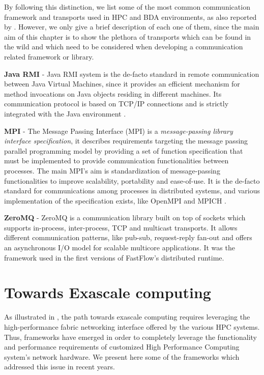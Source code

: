 By following this distinction, we list some of the most common communication framework and transports used in HPC and BDA environments, as also reported by \cite{survey-distributed}. However, we only give a brief description of each one of them, since the main aim of this chapter is to show the plethora of transports which can be found in the wild and which need to be considered when developing a communication related framework or library.\newline

\textbf{Java RMI} -  Java RMI system \cite{javarmi} is the de-facto standard in remote communication between Java Virtual Machines, since it provides an efficient mechanism for method invocations on Java objects residing in different machines. Its communication protocol is based on TCP/IP connections and is strictly integrated with the Java environment \cite{javaRMI-toHPC++}.\newline

\textbf{MPI} - The Message Passing Interface (MPI) \cite{mpi40} is a \textit{message-passing library interface specification}, it describes requirements targeting the message passing parallel programming model by providing a set of function specification that must be implemented to provide communication functionalities between processes. The main MPI's aim is standardization of message-passing functionalities to improve scalability, portability and ease-of-use. It is the de-facto standard for communications among processes in distributed systems, and various implementation of the specification exists, like OpenMPI \cite{openMPI} and MPICH \cite{MPICH}.\newline

\textbf{ZeroMQ} - ZeroMQ \cite{zeromq} is a communication library built on top of sockets which supports in-process, inter-process, TCP and multicast transports. It allows different communication patterns, like pub-sub, request-reply fan-out and offers an asynchronous I/O model for scalable multicore applications. It was the framework used in the first versions of FastFlow's distributed runtime.

\section{Towards Exascale computing}
As illustrated in \cite{exa-big}, the path towards exascale computing requires leveraging the high-performance fabric networking interface offered by the various HPC systems. Thus, frameworks have emerged in order to completely leverage the functionality and performance requirements of customized High Performance Computing system's network hardware. We present here some of the frameworks which addressed this issue in recent years.\newline

